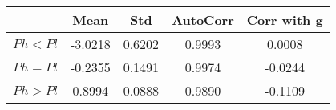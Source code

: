 \begin{tiny}\begin{tabular}{|l|c|c|c|c|}
\hline
&\textbf{Mean}&\textbf{Std}&\textbf{AutoCorr}&\textbf{Corr with g}\\\hline
\textbf{$Ph<Pl$}&-3.0218&0.6202&0.9993&0.0008\\\hline
\textbf{$Ph=Pl$}&-0.2355&0.1491&0.9974&-0.0244\\\hline
\textbf{$Ph>Pl$}&0.8994&0.0888&0.9890&-0.1109\\\hline
\end{tabular}
\end{tiny}